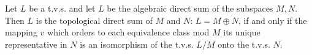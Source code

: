 Let $L$ be a t.v.s. and let $L$ be the algebraic direct sum of the subspaces $M, N$. Then $L$ is the topological direct sum of $M$ and $N$: $L = M \oplus N$, if and only if the mapping $v$ which orders to each equivalence class mod $M$ its unique representative in $N$ is an isomorphism of the t.v.s. $L/M$ onto the t.v.s. $N$.
